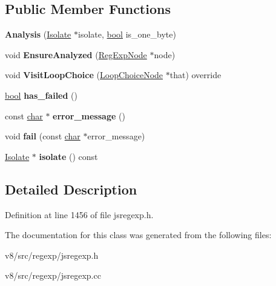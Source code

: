 \subsection*{Public Member Functions}
\begin{DoxyCompactItemize}
\item 
\mbox{\label{classv8_1_1internal_1_1Analysis_a9925eeff18694fcb670f5fe76186fffe}} 
{\bfseries Analysis} (\mbox{\hyperlink{classv8_1_1internal_1_1Isolate}{Isolate}} $\ast$isolate, \mbox{\hyperlink{classbool}{bool}} is\+\_\+one\+\_\+byte)
\item 
\mbox{\label{classv8_1_1internal_1_1Analysis_a91ea9ab34a0b720e4ba0414997e6f978}} 
void {\bfseries Ensure\+Analyzed} (\mbox{\hyperlink{classv8_1_1internal_1_1RegExpNode}{Reg\+Exp\+Node}} $\ast$node)
\item 
\mbox{\label{classv8_1_1internal_1_1Analysis_a8d30713c3878c3320ac3bcfaeed1ecad}} 
void {\bfseries Visit\+Loop\+Choice} (\mbox{\hyperlink{classv8_1_1internal_1_1LoopChoiceNode}{Loop\+Choice\+Node}} $\ast$that) override
\item 
\mbox{\label{classv8_1_1internal_1_1Analysis_a49fb801db5532a96bc0c078e3c928910}} 
\mbox{\hyperlink{classbool}{bool}} {\bfseries has\+\_\+failed} ()
\item 
\mbox{\label{classv8_1_1internal_1_1Analysis_a70729ef89c68f6ba50909873d438fe47}} 
const \mbox{\hyperlink{classchar}{char}} $\ast$ {\bfseries error\+\_\+message} ()
\item 
\mbox{\label{classv8_1_1internal_1_1Analysis_ae430a167d7e2e6cf98834465c537a64e}} 
void {\bfseries fail} (const \mbox{\hyperlink{classchar}{char}} $\ast$error\+\_\+message)
\item 
\mbox{\label{classv8_1_1internal_1_1Analysis_a53b9010bb43e8094791444d5f358dc36}} 
\mbox{\hyperlink{classv8_1_1internal_1_1Isolate}{Isolate}} $\ast$ {\bfseries isolate} () const
\end{DoxyCompactItemize}


\subsection{Detailed Description}


Definition at line 1456 of file jsregexp.\+h.



The documentation for this class was generated from the following files\+:\begin{DoxyCompactItemize}
\item 
v8/src/regexp/jsregexp.\+h\item 
v8/src/regexp/jsregexp.\+cc\end{DoxyCompactItemize}
